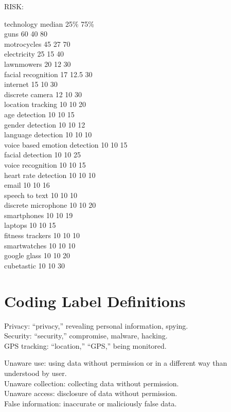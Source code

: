 \documentclass{acm_proc_article-sp}
\begin{document}
RISK: 

technology 	median	25\%		75\%\\
guns	60	40	80\\
motrocycles	45	27	70\\
electricity	25	15	40\\
lawnmowers	20	12	30\\
facial recognition	17	12.5	30\\
internet	15	10	30\\
discrete camera	12	10	30\\
location tracking	10	10	20\\
age detection	10	10	15\\
gender detection	10	10	12\\
language detection	10	10	10\\
voice based emotion detection	10	10	15\\
facial detection	10	10	25\\
voice recognition	10	10	15\\
heart rate detection	10	10	10\\
email	10	10	16\\
speech to text	10	10	10\\
discrete microphone	10	10	20\\
smartphones	10	10	19\\
laptops	10	10	15\\
fitness trackers	10	10	10\\
smartwatches	10	10	10\\
google glass	10	10	20\\
cubetastic	10	10	30

\section{Coding Label Definitions}
\label{sec:coding}

Privacy: ``privacy,'' revealing personal information, spying. \\
Security:  ``security,'' compromise, malware, hacking. \\
GPS tracking: ``location,'' ``GPS,'' being monitored. 

Unaware use: using data without permission or in a different way than understood by user. \\
Unaware collection: collecting data without permission. \\
Unaware access: disclosure of data without permission. \\
False information: inaccurate or maliciously false data.
\end{document}
